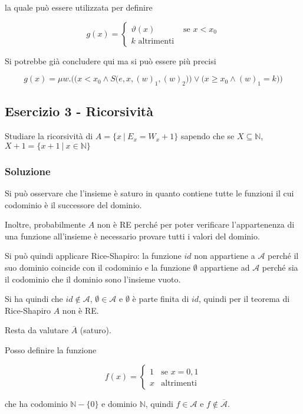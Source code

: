 la quale può essere utilizzata per definire

$$
g(x) = \begin{cases}
\vartheta(x) &\text{ se } x < x_0 \\
k \text{ altrimenti}
\end{cases}
$$

Si potrebbe già concludere qui ma si può essere più precisi

$$
g(x) = \mu w. \Bigg(  \bigg( x < x_0 \wedge S\Big( e,x,(w)_1, (w)_2\Big) \bigg)   \vee \Big(   x \geq x_0 \wedge (w)_1 = k  \Big)   \Bigg)
$$

\subsection{Esercizio 3 - Ricorsività}

Studiare la ricorsività di $A = \{ x \: | \: E_x = W_x +1  \}$ sapendo che se  $X \subseteq \mathbb{N}$, $X +1 = \{ x+1 \: | \: x \in \mathbb{N}\}$

\subsubsection{Soluzione}

Si può osservare che l'insieme è saturo in quanto contiene tutte le funzioni il cui codominio è il successore del dominio.

Inoltre, probabilmente $A$ non è RE perché per poter verificare l'appartenenza di una funzione all'insieme è necessario provare tutti i valori del dominio.

Si può quindi applicare Rice-Shapiro: la funzione $id$ non appartiene a $\mathcal{A}$ perché il suo dominio coincide con il codominio e la funzione $\emptyset$ appartiene ad $\mathcal{A}$ perché sia il codominio che il dominio sono l'insieme vuoto.

Si ha quindi che $id \notin \mathcal{A}$, $\emptyset \in \mathcal{A}$ e $\emptyset$ è parte finita di $id$, quindi per il teorema di Rice-Shapiro $A$ non è RE.

Resta da valutare $\overline{A}$ (saturo).

Posso definire la funzione 

$$
f(x) = \begin{cases}
1 &\text{se } x= 0,1 \\
x &\text{altrimenti}
\end{cases}
$$

che ha codominio $\mathbb{N} - \{ 0 \}$ e dominio $\mathbb{N}$, quindi $f \in \mathcal{A}$ e $f \notin \overline{\mathcal{A}}$.

